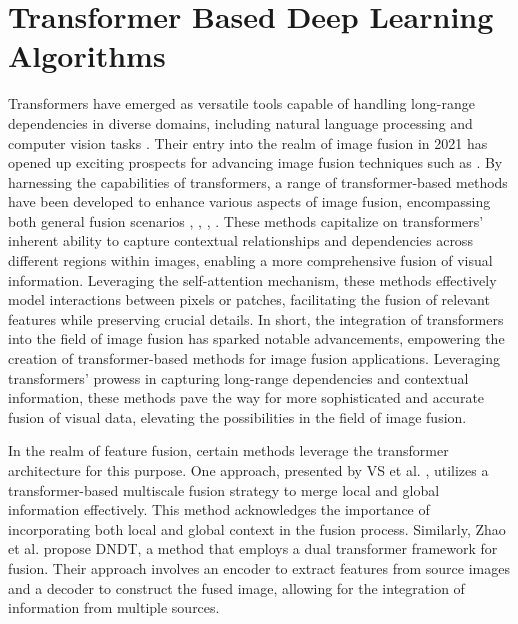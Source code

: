 \section{Transformer Based Deep Learning Algorithms}
\label{sec:Transformer}

Transformers have emerged as versatile tools capable of handling long-range dependencies in diverse domains, including natural language processing and computer vision tasks \cite{dosovitskiy2020image, liu2021swin, liu2022mfst}. Their entry into the realm of image fusion in 2021 has opened up exciting prospects for advancing image fusion techniques such as \cite{zhao2021dndt, rao2023tgfuse, li2022cgtf, tang2022ydtr, wang2022swinfuse, yang2023dglt, tang2023tccfusion}. By harnessing the capabilities of transformers, a range of transformer-based methods have been developed to enhance various aspects of image fusion, encompassing both general fusion scenarios \cite{vs2022image}, \cite{fu2021ppt}, \cite{ma2022swinfusion}, \cite{qu2022transfuse}. These methods capitalize on transformers' inherent ability to capture contextual relationships and dependencies across different regions within images, enabling a more comprehensive fusion of visual information. Leveraging the self-attention mechanism, these methods effectively model interactions between pixels or patches, facilitating the fusion of relevant features while preserving crucial details. In short, the integration of transformers into the field of image fusion has sparked notable advancements, empowering the creation of transformer-based methods for image fusion applications. Leveraging transformers' prowess in capturing long-range dependencies and contextual information, these methods pave the way for more sophisticated and accurate fusion of visual data, elevating the possibilities in the field of image fusion.

In the realm of feature fusion, certain methods leverage the transformer architecture for this purpose. One approach, presented by VS et al. \cite{vs2022image}, utilizes a transformer-based multiscale fusion strategy to merge local and global information effectively. This method acknowledges the importance of incorporating both local and global context in the fusion process. Similarly, Zhao et al. \cite{zhao2021dndt} propose DNDT, a method that employs a dual transformer framework for fusion. Their approach involves an encoder to extract features from source images and a decoder to construct the fused image, allowing for the integration of information from multiple sources.

